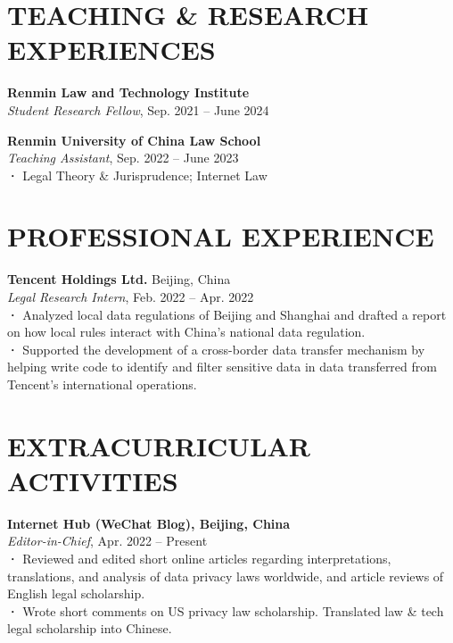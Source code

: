 \documentclass[a4paper,9pt]{extarticle}
\begin{document}

\section*{TEACHING \& RESEARCH EXPERIENCES} 
\noindent
\textbf{Renmin Law and Technology Institute} \\
\textit{Student Research Fellow}, Sep. 2021 – June 2024
\par\medskip
\textbf{Renmin University of China Law School}\\
\textit{Teaching Assistant}, Sep. 2022 – June 2023\\
\textbf{·}  Legal Theory \& Jurisprudence; Internet Law\\

\section*{PROFESSIONAL EXPERIENCE}

\noindent
\textbf{Tencent Holdings Ltd.} Beijing, China \\
\textit{Legal Research Intern}, Feb. 2022 – Apr. 2022\\
\textbf{·}  Analyzed local data regulations of Beijing and Shanghai and drafted a report on how local rules interact with China's national data regulation.
\\
\textbf{·}  Supported the development of a cross-border data transfer mechanism by helping write code to identify and filter sensitive data in data transferred from Tencent's international operations.


\section*{EXTRACURRICULAR ACTIVITIES}

\noindent
\textbf{\textbf{Internet Hub (WeChat Blog)}, Beijing, China\\
}\textit{Editor-in-Chief}, Apr. 2022 – Present
\\
\textbf{·}  Reviewed and edited short online articles regarding interpretations, translations, and analysis of data privacy laws worldwide, and article reviews of English legal scholarship. \\
\textbf{·}  Wrote short comments on US  privacy law scholarship. Translated law \& tech legal scholarship into Chinese.\\
\end{document}
